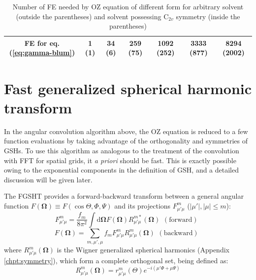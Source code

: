\begin{table}[h]
\begin{minipage}[t]{1.1\columnwidth}
\begin{center}
\begin{tabular*}{1\textwidth}{@{\extracolsep{\fill}}ccccccc}
{\footnotesize{}FE for eq. (\ref{eq:gamma-blum})} & {\footnotesize{}1 (1)} & {\footnotesize{}34 (6)} & {\footnotesize{}259 (75)} & {\footnotesize{}1092 (252)} & {\footnotesize{}3333 (877)} & {\footnotesize{}8294 (2002)}\tabularnewline
\bottomrule
\end{tabular*}\caption[Number of FE needed by OZ equation of different form]{Number of \acs{FE} needed by \acs{OZ} equation of different form
for arbitrary solvent (outside the parentheses) and solvent possessing
$\mathrm{C}_{2v}$ symmetry (inside the parentheses)\label{tab:FE-of-OZ}}
\par\end{center}%
\end{minipage}
\end{table}


\section{Fast generalized spherical harmonic transform\label{sec:fgsht}}

In the angular convolution algorithm above, the \acs{OZ} equation
is reduced to a few function evaluations by taking advantage of the
orthogonality and symmetries of \acs{GSH}s. To use this algorithm
as analogous to the treatment of the convolution with \acs{FFT} for
spatial grids, it \textit{a priori }should be fast. This is exactly
possible owing to the exponential components in the definition of
\acs{GSH}, and a detailed discussion will be given later.

The \acs{FGSHT} provides a forward-backward transform between a general
angular function $F(\mathbf{\Omega})\equiv F(\cos\Theta,\Phi,\Psi)$
and its projections $F_{\mu'\mu}^{m}$ ($\left|\mu'\right|,\left|\mu\right|\leq m$):
\begin{equation}
F_{\mu'\mu}^{m}=\frac{f_{m}}{8\pi^{2}}\int\mathrm{d}\mathbf{\Omega}F(\mathbf{\Omega})R_{\mu'\mu}^{m*}(\mathbf{\Omega})\begin{array}{c}
\mathrm{(forward)}\end{array}\label{eq:GSHT_forward}
\end{equation}
\begin{equation}
F(\mathbf{\Omega})=\sum_{m,\mu',\mu}f_{m}F_{\mu'\mu}^{m}R_{\mu'\mu}^{m}(\mathbf{\Omega})\begin{array}{c}
\mathrm{(backward)}\end{array}\label{eq:GSHT_backward}
\end{equation}
where $R_{\mu'\mu}^{m}(\mathbf{\Omega})$ is the Wigner generalized
spherical harmonics (Appendix \ref{chpt:symmetry}), which form a
complete orthogonal set, being defined as:
\begin{equation}
R_{\mu'\mu}^{m}(\mathbf{\Omega})=r_{\mu'\mu}^{m}(\Theta)e^{-i(\mu'\Phi+\mu\Psi)}
\end{equation}


